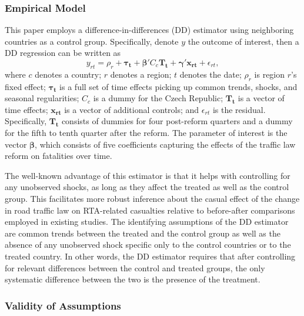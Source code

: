 \documentclass[12pt]{article}
\begin{document}
\subsubsection{Empirical Model} %

This paper employs a difference-in-differences (DD) estimator using neighboring
countries as a control group. Specifically, denote $y$ the outcome of interest,
then a DD regression can be written as \begin{equation} \label{eq:DD} y_{rt} =
  \rho_{r} + \boldsymbol{\tau_{t}} + \boldsymbol{\beta'}C_c\boldsymbol{T_{t}} +
  \boldsymbol{\gamma'}\boldsymbol{x_{rt}} + \epsilon_{rt}, \end{equation} where
$c$ denotes a country; $r$ denotes a region; $t$ denotes the date; $\rho_{r}$ is
region $r$'s fixed effect; $\boldsymbol{\tau_{t}}$ is a full set of time effects
picking up common trends, shocks, and seasonal regularities; $C_c$ is a dummy
for the Czech Republic; $\boldsymbol{T_t}$ is a vector of time effects;
$\boldsymbol{x_{rt}}$ is a vector of additional controls; and $\epsilon_{rt}$ is
the residual.  Specifically, $\boldsymbol{T_t}$ consists of dummies for four
post-reform quarters and a dummy for the fifth to tenth quarter after the
reform.  The parameter of interest is the vector $\boldsymbol{\beta}$, which
consists of five coefficients capturing the effects of the traffic law reform on
fatalities over time.

The well-known advantage of this estimator is that it helps with controlling for
any unobserved shocks, as long as they affect the treated as well as the control
group. This facilitates more robust inference about the casual effect of the
change in road traffic law on RTA-related casualties relative to before-after
comparisons employed in existing studies. The identifying assumptions of the DD
estimator are common trends between the treated and the control group as well as
the absence of any unobserved shock specific only to the control countries or to
the treated country. In other words, the DD estimator requires that after
controlling for relevant differences between the control and treated groups, the
only systematic difference between the two is the presence of the treatment. 

\subsubsection{Validity of Assumptions} %
\end{document}

